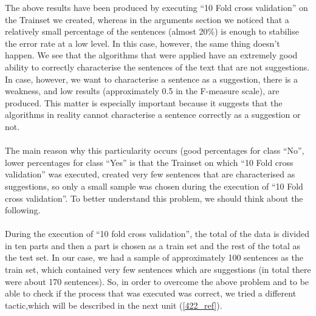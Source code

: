 The above results have been produced by executing ``10 Fold cross validation'' on the Trainset we created, whereas in the arguments section we noticed that a relatively small percentage of the sentences (almost 20\%) is enough to stabilise the error rate at a low level. In this case, however, the same thing doesn't happen. We see that the algorithms that were applied  have an extremely good ability to correctly characterise the sentences of the text that are not suggestions. In case, however, we want to characterise a sentence as a suggestion, there is a weakness, and low results (approximately 0.5 in the F-measure scale), are produced. This matter is especially important because it suggests that the algorithms in reality cannot characterise a sentence correctly as a suggestion or not.\\
\\
The main reason why this particularity occurs (good percentages for class ``No'', lower percentages for class ``Yes'' is that  the Trainset on which ``10 Fold cross validation'' was executed, created  very few sentences that are characterised as suggestions, so only a small sample was chosen during the execution of ``10 Fold cross validation''. To better understand this problem, we should think about the following.\\
\\
During the execution of ``10 fold cross validation'', the total of the data is divided in ten parts and then a part is chosen as a train set and the rest of the total as the test set. In our case, we had a sample of approximately 100 sentences as the train set, which contained very few sentences which are suggestions (in total there were about 170 sentences). So, in order to overcome the above problem and to be able to check if the process that was executed was correct, we tried a different tactic,which will be described in the next unit (\ref{422_ref}).

